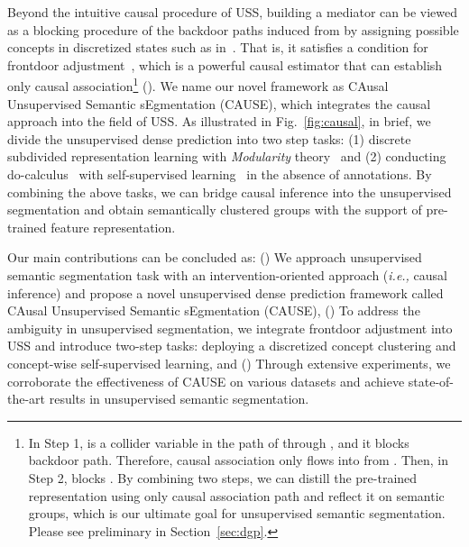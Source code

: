 \documentclass{article} \usepackage{iclr2024_conference,times}
\begin{document}
Beyond the intuitive causal procedure of USS, building a mediator  can be viewed as a blocking procedure of the backdoor paths induced from  by assigning possible concepts in discretized states such as in~\citet{van2017neural, esser2021taming}. That is, it satisfies a condition for frontdoor adjustment~\citep{pearl1993bayesian}, which is a powerful causal estimator that can establish only causal association\footnote{In Step 1,  is a collider variable in the path of  through , and it blocks backdoor path. Therefore, causal association only flows into  from . Then, in Step 2,  blocks . By combining two steps, we can distill the pre-trained representation using only causal association path and reflect it on semantic groups, which is our ultimate goal for unsupervised semantic segmentation. Please see preliminary in Section~\ref{sec:dgp}.} (). We name our novel framework as CAusal Unsupervised Semantic sEgmentation (CAUSE), which integrates the causal approach into the field of USS. As illustrated in Fig.~\ref{fig:causal}, in brief, we divide the unsupervised dense prediction into two step tasks: (1) discrete subdivided representation learning with \textit{Modularity} theory~\citep{newman2006modularity} and (2) conducting do-calculus~\citep{pearl1995causal} with self-supervised learning~\citep{oord2018representation} in the absence of annotations. By combining the above tasks, we can bridge causal inference into the unsupervised segmentation and obtain semantically clustered groups with the support of pre-trained feature representation.

Our main contributions can be concluded as: (\lowercase\expandafter{}) We approach unsupervised semantic segmentation task with an intervention-oriented approach (\textit{i.e.,} causal inference) and propose a novel unsupervised dense prediction framework called CAusal Unsupervised Semantic sEgmentation (CAUSE), (\lowercase\expandafter{}) 
To address the ambiguity in unsupervised segmentation, we integrate frontdoor adjustment into USS and introduce two-step tasks: deploying a discretized concept clustering and concept-wise self-supervised learning, and (\lowercase\expandafter{}) Through extensive experiments, we corroborate the effectiveness of CAUSE on various datasets and achieve state-of-the-art results in unsupervised semantic segmentation.
\end{document}

